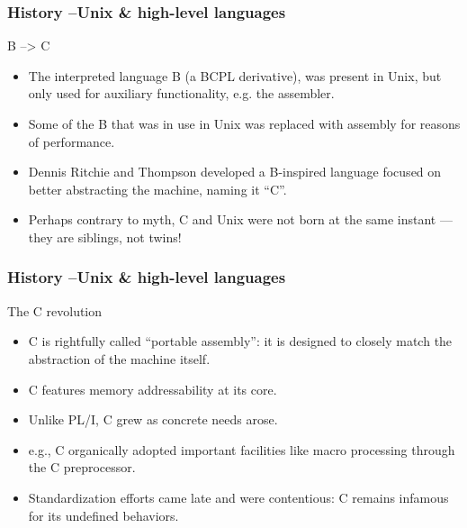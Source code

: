 \begin{frame}[plain]
	\frametitle{History --Unix \& high-level languages}
	
	B --> C
	\begin{itemize}
		
		\item The interpreted language B (a BCPL derivative), was present in
		Unix, but only used for auxiliary functionality, e.g. the assembler.
		
		\item Some of the B that was in use in Unix was replaced with
		assembly for reasons of performance.
		\item Dennis Ritchie and Thompson developed a B-inspired language
		focused on better abstracting the machine, naming it “C”. 
		\item Perhaps contrary to myth, C and Unix were not born at the
		same instant — they are siblings, not twins!
		
		
	\end{itemize}
	
	
\end{frame}


\begin{frame}[plain]
	\frametitle{History --Unix \& high-level languages}
	
	The C revolution
	\begin{itemize}
		
		\item C is rightfully called “portable assembly”: it is designed to
		closely match the abstraction of the machine itself.
		
		\item C features memory addressability at its core.
		\item Unlike PL/I, C grew as concrete needs arose. 
		\item e.g., C organically adopted important facilities like macro
		processing through the C preprocessor.
		\item  Standardization efforts came late and were contentious: C
		remains infamous for its undefined behaviors.
		
		
	\end{itemize}
	
	
\end{frame}


